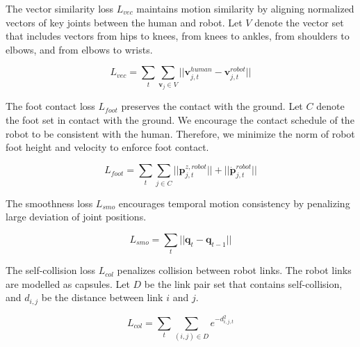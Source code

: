 \documentclass[a4paper, 10pt, conference]{ieeeconf}      %
\begin{document}
The vector similarity loss $L_{vec}$ maintains motion similarity by aligning normalized vectors of key joints between the human and robot. Let $V$ denote the vector set that includes vectors from hips to knees, from knees to ankles, from shoulders to elbows, and from elbows to wrists.

\begin{equation}
    L_{vec} = \sum_t \sum_{\boldsymbol{v}_j \in V} || \boldsymbol{v}_{j,t}^{human} - \boldsymbol{v}_{j,t}^{robot}||
\end{equation}

The foot contact loss $L_{foot}$ preserves the contact with the ground. Let $C$ denote the foot set in contact with the ground. We encourage the contact schedule of the robot to be consistent with the human. Therefore, we minimize the norm of robot foot height and velocity to enforce foot contact.

\begin{equation}
    L_{foot} = \sum_t \sum_{j \in C} || \boldsymbol{p}_{j,t}^{z,robot}|| + ||\boldsymbol{\dot{p}}_{j,t}^{robot}||
\end{equation}



The smoothness loss $L_{smo}$ encourages temporal motion consistency by penalizing large deviation of joint positions.

\begin{equation}
    L_{smo} = \sum_t || \boldsymbol{q}_{t} - \boldsymbol{q}_{t-1} ||
\end{equation}

The self-collision loss $L_{col}$ penalizes collision between robot links. The robot links are modelled as capsules. Let $D$ be the link pair set that contains self-collision, and $d_{i,j}$ be the distance between link $i$ and $j$.

\begin{equation}
    L_{col} = \sum_t \sum_{(i,j) \in D}e^{-d_{i,j,t}^2}
\end{equation}
\end{document}
